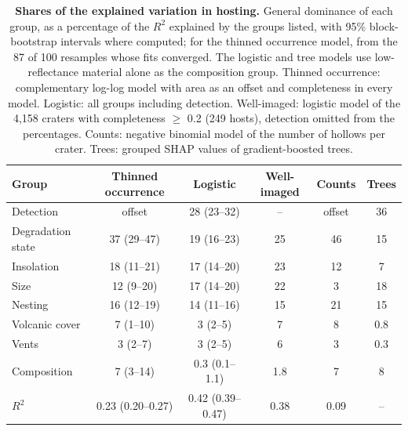 \documentclass{planetary}
\begin{document}
\begin{table}[!ht]
    \mytablestyle
    \caption{{\bf Shares of the explained variation in hosting.} General dominance of each group, as a percentage of the $R^2$ explained by the groups listed, with 95\% block-bootstrap intervals where computed; for the thinned occurrence model, from the 87 of 100 resamples whose fits converged. The logistic and tree models use low-reflectance material alone as the composition group. Thinned occurrence: complementary log-log model with area as an offset and completeness in every model. Logistic: all groups including detection. Well-imaged: logistic model of the 4,158 craters with completeness $\geq$ 0.2 (249 hosts), detection omitted from the percentages. Counts: negative binomial model of the number of hollows per crater. Trees: grouped SHAP values of gradient-boosted trees.}
    \footnotesize{
        \begin{tabularx}{\textwidth}{>{\raggedright\arraybackslash}X c c c c c}
            \toprule
            \textbf{Group} & \textbf{Thinned occurrence} & \textbf{Logistic} & \textbf{Well-imaged} & \textbf{Counts} & \textbf{Trees} \\
            \hline
            Detection & offset & 28 (23--32) & -- & offset & 36 \\
            Degradation state & 37 (29--47) & 19 (16--23) & 25 & 46 & 15 \\
            Insolation & 18 (11--21) & 17 (14--20) & 23 & 12 & 7 \\
            Size & 12 (9--20) & 17 (14--20) & 22 & 3 & 18 \\
            Nesting & 16 (12--19) & 14 (11--16) & 15 & 21 & 15 \\
            Volcanic cover & 7 (1--10) & 3 (2--5) & 7 & 8 & 0.8 \\
            Vents & 3 (2--7) & 3 (2--5) & 6 & 3 & 0.3 \\
            Composition & 7 (3--14) & 0.3 (0.1--1.1) & 1.8 & 7 & 8 \\
            $R^2$ & 0.23 (0.20--0.27) & 0.42 (0.39--0.47) & 0.38 & 0.09 & -- \\
            \hline
        \end{tabularx}}
    \label{tab:joint}
\end{table}
\end{document}
